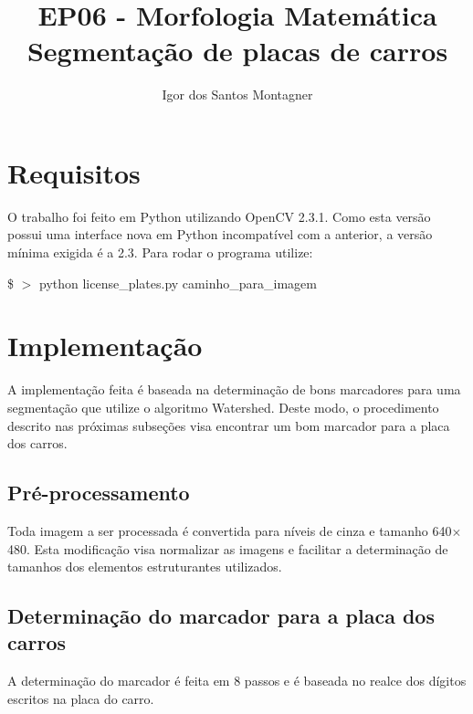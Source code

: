 \documentclass[11pt]{article} %
\title{EP06 - Morfologia Matemática \\ Segmentação de placas de carros}
\author{Igor dos Santos Montagner}
\begin{document}
\maketitle

\section{Requisitos}

O trabalho foi feito em Python utilizando OpenCV 2.3.1. Como esta versão possui uma interface nova em Python incompatível com a anterior, a versão mínima exigida é a 2.3. Para rodar o programa utilize:

 \$ $> $ python license\_plates.py caminho\_para\_imagem

\section{Implementação}

A implementação feita é baseada na determinação de bons marcadores para uma segmentação que utilize o algoritmo Watershed. Deste modo, o procedimento descrito nas próximas subseções visa encontrar um bom marcador para a placa dos carros. 

\subsection{Pré-processamento}

Toda imagem a ser processada é convertida para níveis de cinza e tamanho 640$\times$480. Esta modificação visa normalizar as imagens e facilitar a determinação de tamanhos dos elementos estruturantes utilizados.

\subsection{Determinação do marcador para a placa dos carros}

A determinação do marcador é feita em 8 passos e é baseada no realce dos dígitos escritos na placa do carro. 
\newpage
\end{document}
